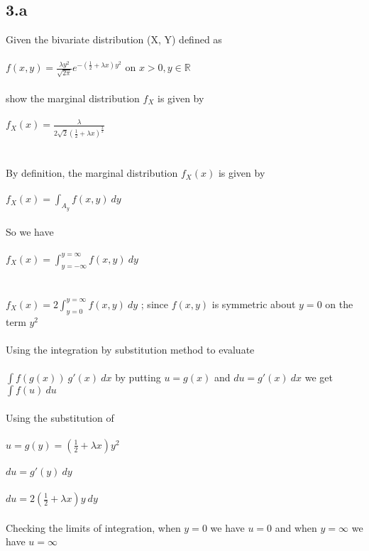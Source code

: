 \documentclass[11pt]{article}   	%
\begin{document}
\subsection*{3.a}
Given the bivariate distribution (X, Y) defined as \\
\\
$ f(x, y) = \frac{\lambda y^2}{\sqrt { 2 \pi } } e^{-( \frac{1}{2} + \lambda x) y^2 } $ on $ x > 0, y \in \mathbb{R} $  \\
\\
show the marginal distribution $f_X$ is given by \\
\\
$ f_X(x) = \frac{\lambda}{2 \sqrt{2} (\frac{1}{2} + \lambda x)^{\frac{3}{2}} } $ \\
\\\\
By definition, the marginal distribution $ f_X(x) $ is given by \\
\\
$ f_X(x) = \displaystyle \int_{A_y} f(x, y) \ dy $ \\
\\
So we have \\
\\
$ f_X(x) = \displaystyle \int_{y = - \infty}^{y = \infty} f(x, y) \ dy $ \\
\\\\
$ f_X(x) = 2 \displaystyle \int_{y = 0}^{y = \infty} f(x, y) \ dy $ ; since $ f(x, y) $ is symmetric about $ y = 0 $ on the term $ y^2 $ \\
\\
Using the integration by substitution method to evaluate \\
\\
$ \displaystyle \int f(g(x)) \ g'(x) \ dx $ by putting $ u = g(x) $ and $ du = g'(x) \ dx $ we get $ \displaystyle \int f(u) \ du $ \\
\\
Using the substitution of \\
\\
$ u = g(y) = (\frac{1}{2} + \lambda x ) y^2 $ \\
\\
$ du = g'(y) \ dy $ \\
\\
$ du = 2(\frac{1}{2} + \lambda x) y \ dy $ \\
\\
Checking the limits of integration, when $ y = 0 $ we have $ u = 0 $ and when $ y = \infty $ we have $ u = \infty $ \\
\end{document}
